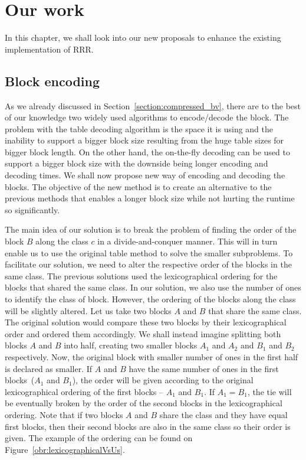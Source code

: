 \chapter{Our work}
\label{kap:kap3}

In this chapter, we shall look into our new proposals to enhance the existing implementation of RRR.

\section{Block encoding}

As we already discussed in Section~\ref{section:compressed_bv}, there are to the best of our knowledge two
widely used algorithms to encode/decode the block. The problem with the table decoding algorithm is the space
it is using and the inability to support a bigger block size resulting from the huge table sizes for bigger
block length. On the other hand, the on-the-fly decoding can be used to support a bigger block size with the
downside being longer encoding and decoding times. We shall now propose new way of encoding and decoding the blocks.
The objective of the new method is to create an alternative to the previous methods that enables a longer block size
while not hurting the runtime so significantly.

The main idea of our solution is to break the problem of finding the order of the block $B$ along the class $c$ in a
divide-and-conquer manner. This will in turn enable us to use the original table method to solve the smaller subproblems.
To facilitate our solution, we need to alter the respective order of the blocks in the same class. The previous solutions
used the lexicographical ordering for the blocks that shared the same class. In our solution, we also use the number of
ones to identify the class of block. However, the ordering of the blocks along the class will be slightly altered.
Let us take two blocks $A$ and $B$ that share the same class. The original solution would compare these two blocks
by their lexicographical order and ordered them accordingly. We shall instead imagine splitting both blocks $A$ and $B$
into half, creating two smaller blocks $A_1$ and $A_2$ and $B_1$ and $B_2$ respectively. Now, the original block
with smaller number of ones in the first half is declared as smaller. If $A$ and $B$ have the same number of ones in the first
blocks~($A_1$ and $B_1$), the order will be given according to the original lexicographical ordering of the first blocks --
$A_1$ and $B_1$. If $A_1 = B_1$, the tie will be eventually broken by the order of the second blocks in the lexicographical
ordering. Note that if two blocks $A$ and $B$ share the class and they have equal first blocks, then their second blocks are
also in the same class so their order is given. The example of the ordering can be found on Figure~\ref{obr:lexicographicalVsUs}.

